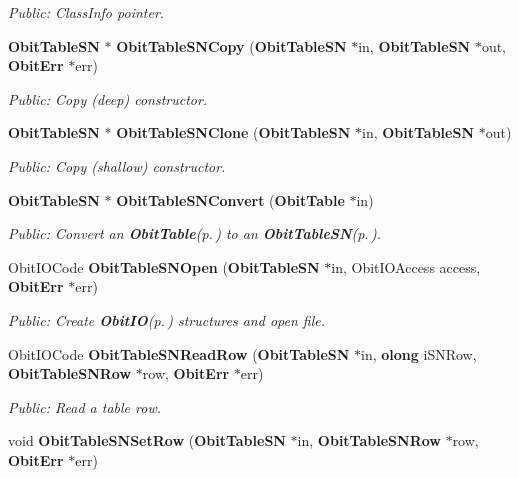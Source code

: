 \begin{CompactItemize}
\begin{CompactList}\small\item\em Public: Class\-Info pointer. \item\end{CompactList}\item 
{\bf Obit\-Table\-SN} $\ast$ {\bf Obit\-Table\-SNCopy} ({\bf Obit\-Table\-SN} $\ast$in, {\bf Obit\-Table\-SN} $\ast$out, {\bf Obit\-Err} $\ast$err)
\begin{CompactList}\small\item\em Public: Copy (deep) constructor. \item\end{CompactList}\item 
{\bf Obit\-Table\-SN} $\ast$ {\bf Obit\-Table\-SNClone} ({\bf Obit\-Table\-SN} $\ast$in, {\bf Obit\-Table\-SN} $\ast$out)
\begin{CompactList}\small\item\em Public: Copy (shallow) constructor. \item\end{CompactList}\item 
{\bf Obit\-Table\-SN} $\ast$ {\bf Obit\-Table\-SNConvert} ({\bf Obit\-Table} $\ast$in)
\begin{CompactList}\small\item\em Public: Convert an {\bf Obit\-Table}{\rm (p.\,\pageref{structObitTable})} to an {\bf Obit\-Table\-SN}{\rm (p.\,\pageref{structObitTableSN})}. \item\end{CompactList}\item 
Obit\-IOCode {\bf Obit\-Table\-SNOpen} ({\bf Obit\-Table\-SN} $\ast$in, Obit\-IOAccess access, {\bf Obit\-Err} $\ast$err)
\begin{CompactList}\small\item\em Public: Create {\bf Obit\-IO}{\rm (p.\,\pageref{structObitIO})} structures and open file. \item\end{CompactList}\item 
Obit\-IOCode {\bf Obit\-Table\-SNRead\-Row} ({\bf Obit\-Table\-SN} $\ast$in, {\bf olong} i\-SNRow, {\bf Obit\-Table\-SNRow} $\ast$row, {\bf Obit\-Err} $\ast$err)
\begin{CompactList}\small\item\em Public: Read a table row. \item\end{CompactList}\item 
void {\bf Obit\-Table\-SNSet\-Row} ({\bf Obit\-Table\-SN} $\ast$in, {\bf Obit\-Table\-SNRow} $\ast$row, {\bf Obit\-Err} $\ast$err)

\end{CompactItemize}
